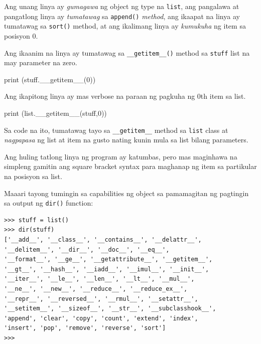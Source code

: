 \documentclass[10pt,]{book}
\newenvironment{Shaded}{}{}
\newcommand{\BuiltInTok}[1]{\textcolor[rgb]{0.00,0.50,0.00}{#1}}
\newcommand{\DecValTok}[1]{\textcolor[rgb]{0.25,0.63,0.44}{#1}}
\newcommand{\FunctionTok}[1]{\textcolor[rgb]{0.02,0.16,0.49}{#1}}
\newcommand{\NormalTok}[1]{#1}
\begin{document}
Ang unang linya ay \emph{gumagawa} ng object ng type na \texttt{list},
ang pangalawa at pangatlong linya ay \emph{tumatawag} sa
\texttt{append()} \emph{method}, ang ikaapat na linya ay tumatawag sa
\texttt{sort()} method, at ang ikalimang linya ay \emph{kumukuha} ng
item sa posisyon 0.

Ang ikaanim na linya ay tumatawag sa \texttt{\_\_getitem\_\_()} method
sa \texttt{stuff} list na may parameter na zero.

\begin{Shaded}
\begin{Highlighting}[]
\BuiltInTok{print}\NormalTok{ (stuff.}\FunctionTok{\_\_getitem\_\_}\NormalTok{(}\DecValTok{0}\NormalTok{))}
\end{Highlighting}
\end{Shaded}

Ang ikapitong linya ay mas verbose na paraan ng pagkuha ng 0th item sa
list.

\begin{Shaded}
\begin{Highlighting}[]
\BuiltInTok{print}\NormalTok{ (}\BuiltInTok{list}\NormalTok{.}\FunctionTok{\_\_getitem\_\_}\NormalTok{(stuff,}\DecValTok{0}\NormalTok{))}
\end{Highlighting}
\end{Shaded}

Sa code na ito, tumatawag tayo sa \texttt{\_\_getitem\_\_} method sa
\texttt{list} class at \emph{nagpapasa} ng list at item na gusto nating
kunin mula sa list bilang parameters.

Ang huling tatlong linya ng program ay katumbas, pero mas maginhawa na
simpleng gamitin ang square bracket syntax para maghanap ng item sa
partikular na posisyon sa list.

Maaari tayong tumingin sa capabilities ng object sa pamamagitan ng
pagtingin sa output ng \texttt{dir()} function:

{\small
\begin{verbatim}
>>> stuff = list()
>>> dir(stuff)
['__add__', '__class__', '__contains__', '__delattr__',
'__delitem__', '__dir__', '__doc__', '__eq__',
'__format__', '__ge__', '__getattribute__', '__getitem__',
'__gt__', '__hash__', '__iadd__', '__imul__', '__init__',
'__iter__', '__le__', '__len__', '__lt__', '__mul__',
'__ne__', '__new__', '__reduce__', '__reduce_ex__',
'__repr__', '__reversed__', '__rmul__', '__setattr__',
'__setitem__', '__sizeof__', '__str__', '__subclasshook__',
'append', 'clear', 'copy', 'count', 'extend', 'index',
'insert', 'pop', 'remove', 'reverse', 'sort']
>>>
\end{verbatim}
}
\end{document}
